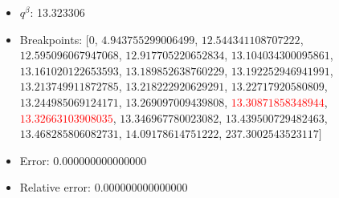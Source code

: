 \documentclass{article}%
\begin{document}
\begin{itemize}
\begin{itemize}
		\item $q^\beta$: 13.323306%
		\item Breakpoints: $[$$0$, $4.943755299006499$, $12.544341108707222$, $12.595096067947068$, $12.917705220652834$, $13.104034300095861$, $13.161020122653593$, $13.189852638760229$, $13.192252946941991$, $13.213749911872785$, $13.218222920629291$, $13.22717920580809$, $13.244985069124171$, $13.269097009439808$, \textcolor{red}{$13.30871858348944$}, \textcolor{red}{$13.32663103908035$}, $13.346967780023082$, $13.439500729482463$, $13.468285806082731$, $14.09178614751222$, $237.3002543523117$$]$%
		\item Error: 0.000000000000000%
		\item Relative error: 0.000000000000000%
	\end{itemize}%
\end{itemize}%
\end{document}
